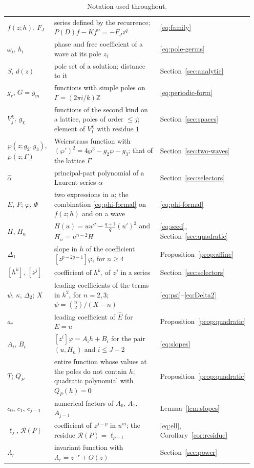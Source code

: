 \documentclass[11pt]{article}
\theoremstyle{definition}
\theoremstyle{remark}
\numberwithin{equation}{section}
\newcommand{\ZZ}{\mathbb Z}
\newcommand{\hatt}[1]{\widehat{#1}}
\begin{document}
\begin{table}[H]
\begin{tabular}{@{}l@{\hspace{1em}}>{\raggedright\arraybackslash}p{}@{\hspace{1em}}l@{}}
\(f(z;h)\), \(F_J\) & series defined by the recurrence; \(P(D)f-Kf^n=-F_Jz^q\) & \eqref{eq:family}\\
\(\omega_i\), \(h_i\) & phase and free coefficient of a wave at its pole \(z_i\) & \eqref{eq:pole-germs}\\
\(S\), \(d(z)\) & pole set of a solution; distance to it & Section~\ref{sec:analytic}\\
\(g_r\), \(G=g_m\) & functions with simple poles on \(\Gamma=(2\pi i/k)\ZZ\) & \eqref{eq:periodic-form}\\
\(V_j^\chi\), \(g_\chi\) & functions of the second kind on a lattice, poles of order \(\le j\); element of \(V_1^\chi\) with residue \(1\) & Section~\ref{sec:spaces}\\
\(\wp(z;g_2,g_3)\), \(\wp(z;\Gamma)\) & Weierstrass function with \((\wp')^2=4\wp^3-g_2\wp-g_3\); that of the lattice \(\Gamma\) & Section~\ref{sec:two-waves}\\
\(\hatt\alpha\) & principal-part polynomial of a Laurent series \(\alpha\) & Section~\ref{sec:selectors}\\
\(E\), \(F\); \(\varphi\), \(\Phi\) & two expressions in \(u\); the combination \eqref{eq:phi-formal} on \(f(z;h)\) and on a wave & \eqref{eq:phi-formal}\\
\(H\), \(H_n\) & \(H(u)=uu''-\tfrac{q+1}{q}(u')^2\) and \(H_n=u^{n-2}H\) & \eqref{eq:seed}, Section~\ref{sec:quadratic}\\
\(\Delta_1\) & slope in \(h\) of the coefficient \([z^{p-2q-1}]\varphi\), for \(n\ge4\) & Proposition~\ref{prop:affine}\\
\([h^k]\), \([z^j]\) & coefficient of \(h^k\), of \(z^j\) in a series & Section~\ref{sec:selectors}\\
\(\psi\), \(\kappa\), \(\Delta_2\); \(X\) & leading coefficients of the terms in \(h^2\), for \(n=2,3\); \(\psi=\binom n2/(X-n)\) & \eqref{eq:psi}--\eqref{eq:Delta2}\\
\(a_*\) & leading coefficient of \(\hatt E\) for \(E=u\) & Proposition~\ref{prop:quadratic}\\
\(A_i\), \(B_i\) & \([z^i]\varphi=A_ih+B_i\) for the pair \((u,H_n)\) and \(i\le J-2\) & \eqref{eq:slopes}\\
\(T\); \(Q_P\) & entire function whose values at the poles do not contain \(h\); quadratic polynomial with \(Q_P(h)=0\) & Proposition~\ref{prop:quadratic}\\
\(c_0\), \(c_1\), \(c_{j-1}\) & numerical factors of \(A_0\), \(A_1\), \(A_{j-1}\) & Lemma~\ref{lem:slopes}\\
\(\ell_j\), \(\mathcal R(P)\) & coefficient of \(z^{j-p}\) in \(u^m\); the residue \(\mathcal R(P)=\ell_{p-1}\) & \eqref{eq:ell}, Corollary~\ref{cor:residue}\\
\(\Lambda_r\) & invariant function with \(\Lambda_r=z^{-r}+O(z)\) & Section~\ref{sec:power}\\
\bottomrule
\end{tabular}
\caption{Notation used throughout.}
\label{tab:notation}
\end{table}
\end{document}
